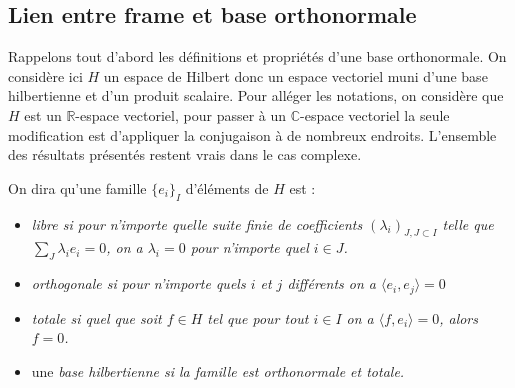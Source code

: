 \subsection{Lien entre frame et base orthonormale}
Rappelons tout d'abord les définitions et propriétés d'une base orthonormale. On considère ici $H$ un espace de Hilbert donc un espace vectoriel muni d'une base hilbertienne et d'un produit scalaire.
Pour alléger les notations, on considère que $H$ est un $\mathbb{R}$-espace vectoriel, pour passer à un $\mathbb{C}$-espace vectoriel la seule modification est d'appliquer la conjugaison à de nombreux endroits.
L'ensemble des résultats présentés restent vrais dans le cas complexe.
\begin{definition}
	On dira qu'une famille $\{e_i\}_I$ d'éléments de $H$ est :
	\begin{itemize}
		\item \it{libre} si pour n'importe quelle suite finie de coefficients $(\lambda_i)_{J, J\subset I}$ telle que $\sum_J \lambda_i e_i = 0$, on a $\lambda_i = 0$ pour n'importe quel $i \in J$.
		\item \it{orthogonale} si pour n'importe quels $i$ et $j$ différents on a $\langle e_i, e_j \rangle = 0$
		\item \it{totale} si quel que soit $f \in H$ tel que pour tout $i\in I$ on a $\langle f, e_i \rangle = 0$, alors $f =0$.
		\item une \it{base hilbertienne} si la famille est orthonormale et totale.
	\end{itemize}
\end{definition}

